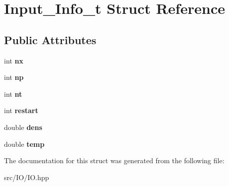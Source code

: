 \hypertarget{struct_input___info__t}{}\section{Input\+\_\+\+Info\+\_\+t Struct Reference}
\label{struct_input___info__t}
\subsection*{Public Attributes}
\begin{DoxyCompactItemize}
\item 
\hypertarget{struct_input___info__t_a5feb8e378b6fbd9381ed57ef740442c9}{}\label{struct_input___info__t_a5feb8e378b6fbd9381ed57ef740442c9} 
int {\bfseries nx}
\item 
\hypertarget{struct_input___info__t_a8b68ac22dc16c9cd477d4453a79a36fa}{}\label{struct_input___info__t_a8b68ac22dc16c9cd477d4453a79a36fa} 
int {\bfseries np}
\item 
\hypertarget{struct_input___info__t_aaa9358b4befa5b3d1e49ad5e01e1479a}{}\label{struct_input___info__t_aaa9358b4befa5b3d1e49ad5e01e1479a} 
int {\bfseries nt}
\item 
\hypertarget{struct_input___info__t_a455e1f52527a77caf01262001159bc24}{}\label{struct_input___info__t_a455e1f52527a77caf01262001159bc24} 
int {\bfseries restart}
\item 
\hypertarget{struct_input___info__t_ab546d417babbd8d41c67a68d46100a91}{}\label{struct_input___info__t_ab546d417babbd8d41c67a68d46100a91} 
double {\bfseries dens}
\item 
\hypertarget{struct_input___info__t_ab3e5d89692bbc8eb2b14a22cad1e790a}{}\label{struct_input___info__t_ab3e5d89692bbc8eb2b14a22cad1e790a} 
double {\bfseries temp}
\end{DoxyCompactItemize}


The documentation for this struct was generated from the following file\+:\begin{DoxyCompactItemize}
\item 
src/\+I\+O/I\+O.\+hpp\end{DoxyCompactItemize}
